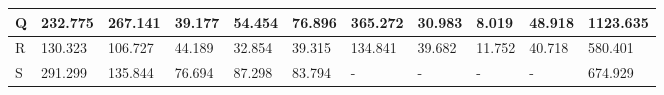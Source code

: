 \begin{landscape}
\begin{longtable}[c]{|l|llllllllll|}
  Q                                                                               & \multicolumn{1}{l|}{232.775}                                                        & \multicolumn{1}{l|}{267.141}                                                        & \multicolumn{1}{l|}{39.177}                                                         & \multicolumn{1}{l|}{54.454}                                                         & \multicolumn{1}{l|}{76.896}                                                         & \multicolumn{1}{l|}{365.272}                                                        & \multicolumn{1}{l|}{30.983}                                    & \multicolumn{1}{l|}{8.019}                                     & \multicolumn{1}{l|}{48.918}                                        & 1123.635                                                                               \\ \hline
  R                                                                               & \multicolumn{1}{l|}{130.323}                                                        & \multicolumn{1}{l|}{106.727}                                                        & \multicolumn{1}{l|}{44.189}                                                         & \multicolumn{1}{l|}{32.854}                                                         & \multicolumn{1}{l|}{39.315}                                                         & \multicolumn{1}{l|}{134.841}                                                        & \multicolumn{1}{l|}{39.682}                                    & \multicolumn{1}{l|}{11.752}                                    & \multicolumn{1}{l|}{40.718}                                        & 580.401                                                                                \\ \hline
  S                                                                               & \multicolumn{1}{l|}{291.299}                                                        & \multicolumn{1}{l|}{135.844}                                                        & \multicolumn{1}{l|}{76.694}                                                         & \multicolumn{1}{l|}{87.298}                                                         & \multicolumn{1}{l|}{83.794}                                                         & \multicolumn{1}{l|}{-}                                                              & \multicolumn{1}{l|}{-}                                         & \multicolumn{1}{l|}{-}                                         & \multicolumn{1}{l|}{-}                                             & 674.929                                                                                \\ \hline

\end{longtable}
\end{landscape}
